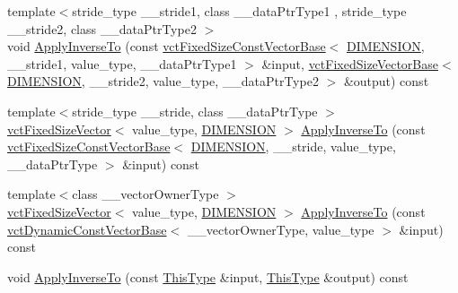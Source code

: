 \begin{DoxyCompactItemize}
{\footnotesize template$<$stride\+\_\+type \+\_\+\+\_\+stride1, class \+\_\+\+\_\+data\+Ptr\+Type1 , stride\+\_\+type \+\_\+\+\_\+stride2, class \+\_\+\+\_\+data\+Ptr\+Type2 $>$ }\\void \hyperlink{classvct_matrix_rotation3_const_base_ac93acb8c499f807f4983fd8f5a024329}{Apply\+Inverse\+To} (const \hyperlink{classvct_fixed_size_const_vector_base}{vct\+Fixed\+Size\+Const\+Vector\+Base}$<$ \hyperlink{classvct_matrix_rotation3_const_base_a6bc9712dde55ee3fca0d7880feb6a903afdf02f4ad230d81f0ca2539c7feb61f3}{D\+I\+M\+E\+N\+S\+I\+O\+N}, \+\_\+\+\_\+stride1, value\+\_\+type, \+\_\+\+\_\+data\+Ptr\+Type1 $>$ \&input, \hyperlink{classvct_fixed_size_vector_base}{vct\+Fixed\+Size\+Vector\+Base}$<$ \hyperlink{classvct_matrix_rotation3_const_base_a6bc9712dde55ee3fca0d7880feb6a903afdf02f4ad230d81f0ca2539c7feb61f3}{D\+I\+M\+E\+N\+S\+I\+O\+N}, \+\_\+\+\_\+stride2, value\+\_\+type, \+\_\+\+\_\+data\+Ptr\+Type2 $>$ \&output) const 
\item 
{\footnotesize template$<$stride\+\_\+type \+\_\+\+\_\+stride, class \+\_\+\+\_\+data\+Ptr\+Type $>$ }\\\hyperlink{classvct_fixed_size_vector}{vct\+Fixed\+Size\+Vector}$<$ value\+\_\+type, \hyperlink{classvct_matrix_rotation3_const_base_a6bc9712dde55ee3fca0d7880feb6a903afdf02f4ad230d81f0ca2539c7feb61f3}{D\+I\+M\+E\+N\+S\+I\+O\+N} $>$ \hyperlink{classvct_matrix_rotation3_const_base_a30a4e8383a9a979d80edf0d8765d3e86}{Apply\+Inverse\+To} (const \hyperlink{classvct_fixed_size_const_vector_base}{vct\+Fixed\+Size\+Const\+Vector\+Base}$<$ \hyperlink{classvct_matrix_rotation3_const_base_a6bc9712dde55ee3fca0d7880feb6a903afdf02f4ad230d81f0ca2539c7feb61f3}{D\+I\+M\+E\+N\+S\+I\+O\+N}, \+\_\+\+\_\+stride, value\+\_\+type, \+\_\+\+\_\+data\+Ptr\+Type $>$ \&input) const 
\item 
{\footnotesize template$<$class \+\_\+\+\_\+vector\+Owner\+Type $>$ }\\\hyperlink{classvct_fixed_size_vector}{vct\+Fixed\+Size\+Vector}$<$ value\+\_\+type, \hyperlink{classvct_matrix_rotation3_const_base_a6bc9712dde55ee3fca0d7880feb6a903afdf02f4ad230d81f0ca2539c7feb61f3}{D\+I\+M\+E\+N\+S\+I\+O\+N} $>$ \hyperlink{classvct_matrix_rotation3_const_base_a31ede991797a7d64c2e53e5580a50a58}{Apply\+Inverse\+To} (const \hyperlink{classvct_dynamic_const_vector_base}{vct\+Dynamic\+Const\+Vector\+Base}$<$ \+\_\+\+\_\+vector\+Owner\+Type, value\+\_\+type $>$ \&input) const 
\item 
void \hyperlink{classvct_matrix_rotation3_const_base_a90a8b49af7a9689a7f3a1917702d59fc}{Apply\+Inverse\+To} (const \hyperlink{classvct_matrix_rotation3_const_base_ad26bf016ce37ea0532e1ce0aa7bba8a0}{This\+Type} \&input, \hyperlink{classvct_matrix_rotation3_const_base_ad26bf016ce37ea0532e1ce0aa7bba8a0}{This\+Type} \&output) const 

\end{DoxyCompactItemize}
